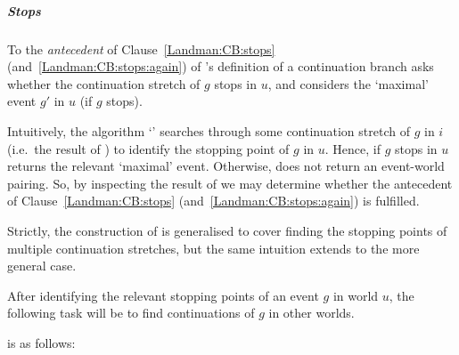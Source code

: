 \subparagraph{Stops}
\label{cha:sec:fcs-def:progressive-landman:alg:stops}

\begin{note}[\AlgGetStops{}]
  To the \emph{antecedent} of Clause~\ref{Landman:CB:stops} (and~\ref{Landman:CB:stops:again}) of \citeauthor{Landman:1992wh}'s definition of a continuation branch asks whether the continuation stretch of \(g\) stops in \(u\), and considers the `maximal' event \(g'\) in \(u\) (if \(g\) stops).

  Intuitively, the algorithm `\AlgGetStops{}' searches through some continuation stretch of \(g\) in \(i\) (i.e.\ the result of ) to identify the stopping point of \(g\) in \(u\).
  Hence, if \(g\) stops in \(u\) \AlgGetStops{} returns the relevant `maximal' event.
  Otherwise, \AlgGetStops{} does not return an event-world pairing.
  So, by inspecting the result of \AlgGetStops{} we may determine whether the antecedent of Clause~\ref{Landman:CB:stops} (and~\ref{Landman:CB:stops:again}) is fulfilled.

  Strictly, the construction of \AlgGetStops{} is generalised to cover finding the stopping points of multiple continuation stretches, but the same intuition extends to the more general case.

  After identifying the relevant stopping points of an event \(g\) in world \(u\), the following task will be to find continuations of \(g\) in other worlds.

  \AlgGetStops{} is as follows:

  \begin{algorithm}[H]
    \label{PrAl:g-s}
    \caption{\AlgGetStops{}}
    \SetAlgoLined
    \DontPrintSemicolon
  \end{algorithm}
\end{note}

